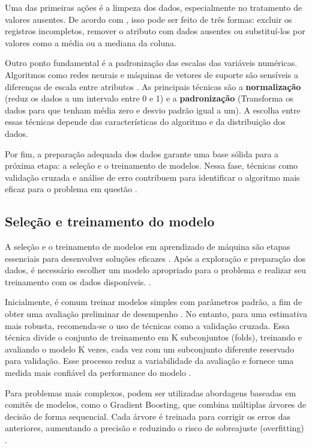 Uma das primeiras ações é a limpeza dos dados, especialmente no tratamento de valores ausentes. De acordo com , isso pode ser feito de três formas: excluir os registros incompletos, remover o atributo com dados ausentes ou substituí-los por valores como a média ou a mediana da coluna.

Outro ponto fundamental é a padronização das escalas das variáveis numéricas. Algoritmos como redes neurais e máquinas de vetores de suporte são sensíveis a diferenças de escala entre atributos \cite{geron2017}. As principais técnicas são a \textbf{normalização} (reduz os dados a um intervalo entre 0 e 1) e a \textbf{padronização} (Transforma os dados para que tenham média zero e desvio padrão igual a um). A escolha entre essas técnicas depende das características do algoritmo e da distribuição dos dados. 

Por fim, a preparação adequada dos dados garante uma base sólida para a próxima etapa: a seleção e o treinamento de modelos. Nessa fase, técnicas como validação cruzada e análise de erro contribuem para identificar o algoritmo mais eficaz para o problema em questão \cite{geron2017}.

\subsection{Seleção e treinamento do modelo}
A seleção e o treinamento de modelos em aprendizado de máquina são etapas essenciais para desenvolver soluções eficazes \cite{geron2017}. Após a exploração e preparação dos dados, é necessário escolher um modelo apropriado para o problema e realizar seu treinamento com os dados disponíveis. \cite{geron2017}. 

Inicialmente, é comum treinar modelos simples com parâmetros padrão, a fim de obter uma avaliação preliminar de desempenho \cite{geron2017}. No entanto, para uma estimativa mais robusta, recomenda-se o uso de técnicas como a validação cruzada. Essa técnica divide o conjunto de treinamento em K subconjuntos (folds), treinando e avaliando o modelo K vezes, cada vez com um subconjunto diferente reservado para validação. Esse processo reduz a variabilidade da avaliação e fornece uma medida mais confiável da performance do modelo \cite{geron2017}.

Para problemas mais complexos, podem ser utilizadas abordagens baseadas em comitês de modelos, como o Gradient Boosting, que combina múltiplas árvores de decisão de forma sequencial. Cada árvore é treinada para corrigir os erros das anteriores, aumentando a precisão e reduzindo o risco de sobreajuste (overfitting) \cite{geron2017}.


